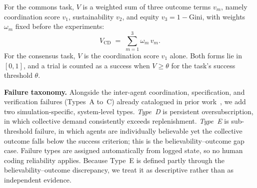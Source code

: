 \documentclass[runningheads]{llncs}
\begin{document}
For the commons task, $V$ is a weighted sum of three outcome terms $v_m$, namely coordination
score $v_1$, sustainability $v_2$, and equity $v_3 = 1 - \text{Gini}$, with weights $\omega_m$
fixed before the experiments:
\begin{equation}\label{eq:vscore}
V_{\mathrm{CD}} \;=\; \sum_{m=1}^{3} \omega_m\, v_m .
\end{equation}
For the consensus task, $V$ is the coordination score $v_1$ alone. Both forms lie in $[0,1]$, and
a trial is counted as a success when $V \geq \theta$ for the task's success threshold $\theta$.

\textbf{Failure taxonomy.} Alongside the inter-agent coordination, specification, and
verification failures (Types~A to~C) already catalogued in prior work~\cite{cemri2025fails}, we
add two simulation-specific, system-level types. \emph{Type~D} is persistent oversubscription, in
which collective demand consistently exceeds replenishment. \emph{Type~E} is sub-threshold
failure, in which agents are individually believable yet the collective outcome falls below the
success criterion; this is the believability--outcome gap case. Failure types are assigned
automatically from logged state, so no human coding reliability applies. Because Type~E is
defined partly through the believability--outcome discrepancy, we treat it as descriptive rather
than as independent evidence.



\end{document}

